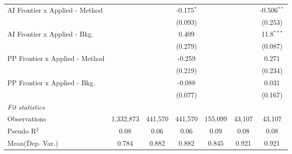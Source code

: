 \begin{tabular}{lcccccc}
   AI Frontier x Applied - Method &               &               & -0.175$^{*}$   &         &               & -0.506$^{**}$\\   
                                  &               &               & (0.093)        &         &               & (0.253)\\   
   AI Frontier x Applied - Bkg.   &               &               & 0.409          &         &               & 11.8$^{***}$\\   
                                  &               &               & (0.279)        &         &               & (0.087)\\   
   PP Frontier x Applied - Method &               &               & -0.259         &         &               & 0.271\\   
                                  &               &               & (0.219)        &         &               & (0.234)\\   
   PP Frontier x Applied - Bkg.   &               &               & -0.088         &         &               & 0.031\\   
                                  &               &               & (0.077)        &         &               & (0.167)\\   
   \midrule
   \emph{Fit statistics}\\
   Observations                   & 1,332,873     & 441,570       & 441,570        & 155,099 & 43,107        & 43,107\\  
   Pseudo R$^2$                   & 0.08          & 0.06          & 0.06           & 0.09    & 0.08          & 0.08\\  
Mean(Dep. Var.) & 0.784 & 0.882 & 0.882 & 0.845 & 0.921 & 0.921 \\
   

\end{tabular}
